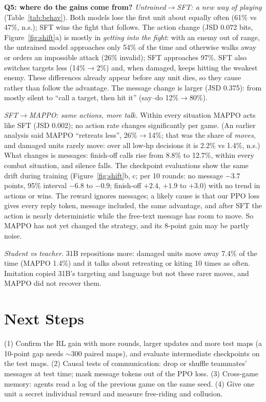 \documentclass{article} %
\begin{document}
\textbf{Q5: where do the gains come from?} \emph{Untrained$\to$SFT: a new way of playing}
(Table~\ref{tab:behav}). Both models lose the first unit about equally often (61\% vs 47\%, n.s.); SFT
wins the fight that follows. The action change (JSD 0.072 bits, Figure~\ref{fig:shift}a) is mostly in
\emph{getting into the fight}: with an enemy out of range, the untrained model approaches only 54\% of
the time and otherwise walks away or orders an impossible attack (26\% invalid); SFT approaches 97\%. SFT
also switches targets less (14\%$\to$2\%) and, when damaged, keeps hitting the weakest enemy. These
differences already appear before any unit dies, so they cause rather than follow the advantage. The
message change is larger (JSD 0.375): from mostly silent to ``call a target, then hit it'' (say--do
12\%$\to$80\%).

\emph{SFT$\to$MAPPO: same actions, more talk.} Within every situation MAPPO acts like SFT (JSD 0.002);
no action rate changes significantly per game. (An earlier analysis said MAPPO ``retreats less'',
26\%$\to$14\%; that was the share of \emph{moves}, and damaged units rarely move: over all low-hp
decisions it is 2.2\% vs 1.4\%, n.s.) What changes is messages: finish-off calls rise from 8.8\% to
12.7\%, within every combat situation, and silence falls. The checkpoint evaluations show the same
drift during training (Figure~\ref{fig:shift}b, c; per 10 rounds: no message $-3.7$ points, 95\%
interval $-6.8$ to $-0.9$; finish-off $+2.4$, $+1.9$ to $+3.0$) with no trend in actions or wins. The
reward ignores messages; a likely cause is that our PPO loss gives every reply token, message included,
the same advantage, and after SFT the action is nearly deterministic while the free-text message has
room to move. So MAPPO has not yet changed the strategy, and its 8-point gain may be partly noise.

\emph{Student vs teacher.} 31B repositions more: damaged units move away 7.4\% of the time (MAPPO
1.4\%) and it talks about retreating or kiting 10 times as often. Imitation copied 31B's targeting and
language but not these rarer moves, and MAPPO did not recover them.

\section{Next Steps}
(1) Confirm the RL gain with more rounds, larger updates and more test maps (a 10-point gap needs
$\sim$300 paired maps), and evaluate intermediate checkpoints on the test maps. (2) Causal tests of
communication: drop or shuffle teammates' messages at test time; mask message tokens out of the PPO
loss. (3) Cross-game memory: agents read a log of the previous game on the same seed. (4) Give one unit
a secret individual reward and measure free-riding and collusion.
\end{document}
